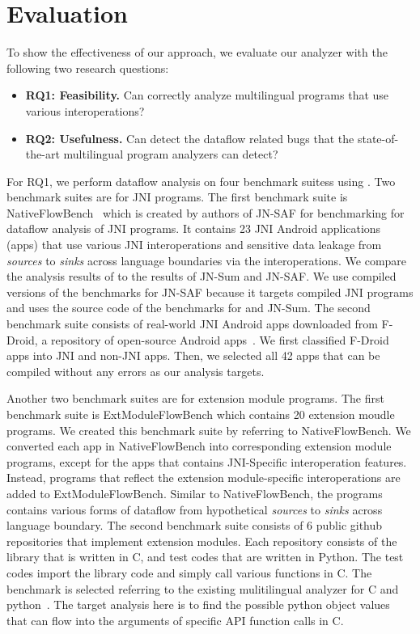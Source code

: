 \newcommand{\req}[1]{RQ#1}


\section{Evaluation}\label{sec:eval}

To show the effectiveness of our approach, we evaluate our analyzer
\ours with the following two research questions:
\begin{itemize}
  \item \textbf{\req{1}: Feasibility.} Can \ours correctly analyze multilingual programs that use
    various interoperations?

  \item \textbf{\req{2}: Usefulness.} Can \ours detect the dataflow related bugs that
    the state-of-the-art multilingual program analyzers can detect?
\end{itemize}

For \req{1}, we perform dataflow analysis on four benchmark suitess using \ours.
Two benchmark suites are for JNI programs.
The first benchmark suite is NativeFlowBench~\cite{nativeflowbench, JN-SAF} which is
created by authors of JN-SAF for benchmarking for dataflow analysis of JNI
programs. It contains 23 JNI Android applications (apps) that use various JNI
interoperations and sensitive data leakage from {\it sources} to {\it sinks}
across language boundaries via the interoperations.  We compare the analysis
results of \ours to the results of JN-Sum and JN-SAF. We use compiled versions
of the benchmarks for JN-SAF because it targets compiled JNI programs and uses
the source code of the benchmarks for \ours and JN-Sum.
The second benchmark suite consists of real-world JNI Android apps downloaded from
F-Droid, a repository of open-source Android apps~\cite{fdroid}.  We first
classified F-Droid apps into JNI and non-JNI apps. Then, we selected all 42
apps that can be compiled without any errors as our analysis targets.

Another two benchmark suites are for extension module programs.  The first
benchmark suite is ExtModuleFlowBench which contains 20 extension moudle
programs. We created this benchmark suite by referring to NativeFlowBench. We
converted each app in NativeFlowBench into corresponding extension module
programs, except for the apps that contains JNI-Specific interoperation
features. Instead, programs that reflect the extension
module-specific interoperations are added to ExtModuleFlowBench.  Similar to
NativeFlowBench, the programs contains various forms of dataflow from
hypothetical {\it sources} to {\it sinks} across language boundary.
The second benchmark suite consists of 6 public github repositories that
implement extension modules.  Each repository consists of the library that is
written in C, and test codes that are written in Python. The test codes
import the library code and simply call various functions in C. The benchmark is
selected referring to the existing mulitilingual analyzer for C and
python~\cite{}. The target analysis here is to find the possible python
object values that can flow into the arguments of specific API function calls in C.

